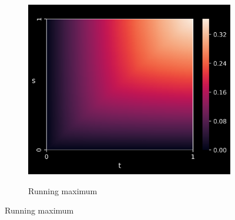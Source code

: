 \begin{figure}[t]
\begin{subfigure}[b]{0.32\textwidth}
    \label{fig:IntK}
\end{subfigure}
\begin{subfigure}[b]{0.32\textwidth}
    \centering
    \caption{Running maximum}
    \includegraphics[scale =0.38]{KL/Figures/KLMaximumKernel.png}
    \label{fig:MaxK}
\end{subfigure}
\vspace{2mm}


\end{figure}
